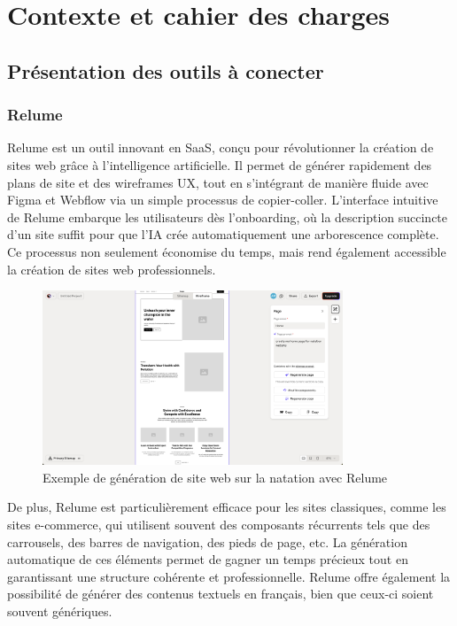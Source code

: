 \chapter{Contexte et cahier des charges}
\section{Présentation des outils à conecter}

\subsection{Relume}

Relume est un outil innovant en SaaS, conçu pour révolutionner la création de sites web grâce à l'intelligence artificielle. Il permet de générer rapidement des plans de site et des wireframes UX, tout en s'intégrant de manière fluide avec Figma et Webflow via un simple processus de copier-coller. L’interface intuitive de Relume embarque les utilisateurs dès l’onboarding, où la description succincte d’un site suffit pour que l’IA crée automatiquement une arborescence complète. Ce processus non seulement économise du temps, mais rend également accessible la création de sites web professionnels.

\begin{figure}[h] 
  \centering
  \includegraphics[width=0.8\textwidth]{Includes/Images/relume.png}
  \caption{Exemple de génération de site web sur la natation avec Relume}
  \label{fig: relume}
\end{figure} 

De plus, Relume est particulièrement efficace pour les sites classiques, comme les sites e-commerce, qui utilisent souvent des composants récurrents tels que des carrousels, des barres de navigation, des pieds de page, etc. La génération automatique de ces éléments permet de gagner un temps précieux tout en garantissant une structure cohérente et professionnelle. Relume offre également la possibilité de générer des contenus textuels en français, bien que ceux-ci soient souvent génériques.


